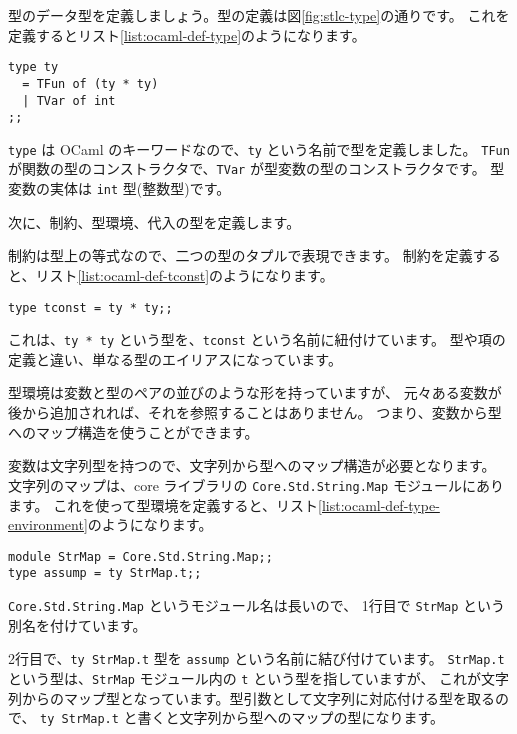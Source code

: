 型のデータ型を定義しましょう。型の定義は図\ref{fig:stlc-type}の通りです。
これを定義するとリスト\ref{list:ocaml-def-type}のようになります。

\begin{lstlisting}[caption=型の定義, label=list:ocaml-def-type]
type ty
  = TFun of (ty * ty)
  | TVar of int
;;
\end{lstlisting}

\texttt{type} は OCaml のキーワードなので、\texttt{ty} という名前で型を定義しました。
\texttt{TFun} が関数の型のコンストラクタで、\texttt{TVar} が型変数の型のコンストラクタです。
型変数の実体は \texttt{int} 型(整数型)です。

次に、制約、型環境、代入の型を定義します。

制約は型上の等式なので、二つの型のタプルで表現できます。
制約を定義すると、リスト\ref{list:ocaml-def-tconst}のようになります。

\begin{lstlisting}[caption=制約の定義, label=list:ocaml-def-tconst]
type tconst = ty * ty;;
\end{lstlisting}

これは、\texttt{ty * ty} という型を、\texttt{tconst} という名前に紐付けています。
型や項の定義と違い、単なる型のエイリアスになっています。

型環境は変数と型のペアの並びのような形を持っていますが、
元々ある変数が後から追加されれば、それを参照することはありません。
つまり、変数から型へのマップ構造を使うことができます。

変数は文字列型を持つので、文字列から型へのマップ構造が必要となります。
文字列のマップは、core ライブラリの \texttt{Core.Std.String.Map} モジュールにあります。
これを使って型環境を定義すると、リスト\ref{list:ocaml-def-type-environment}のようになります。

\begin{lstlisting}[caption=型環境の定義, label=list:ocaml-def-type-environment]
module StrMap = Core.Std.String.Map;;
type assump = ty StrMap.t;;
\end{lstlisting}

\texttt{Core.Std.String.Map} というモジュール名は長いので、
1行目で \texttt{StrMap} という別名を付けています。

2行目で、\texttt{ty StrMap.t} 型を \texttt{assump} という名前に結び付けています。
\texttt{StrMap.t} という型は、\texttt{StrMap} モジュール内の \texttt{t} という型を指していますが、
これが文字列からのマップ型となっています。型引数として文字列に対応付ける型を取るので、
\texttt{ty StrMap.t} と書くと文字列から型へのマップの型になります。

